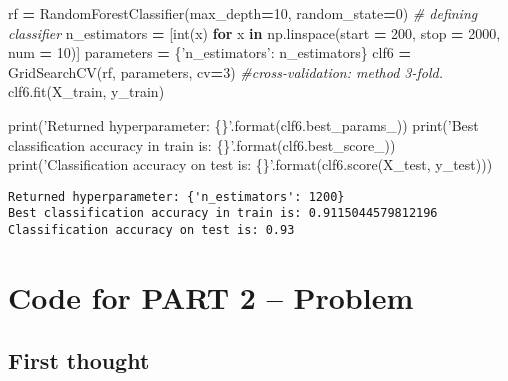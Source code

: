 \documentclass[10pt,a4paper]{article}
\newenvironment{Shaded}{\begin{snugshade}}{\end{snugshade}}
\newcommand{\BuiltInTok}[1]{#1}
\newcommand{\CommentTok}[1]{\textcolor[rgb]{0.56,0.35,0.01}{\textit{#1}}}
\newcommand{\ControlFlowTok}[1]{\textcolor[rgb]{0.13,0.29,0.53}{\textbf{#1}}}
\newcommand{\DecValTok}[1]{\textcolor[rgb]{0.00,0.00,0.81}{#1}}
\newcommand{\KeywordTok}[1]{\textcolor[rgb]{0.13,0.29,0.53}{\textbf{#1}}}
\newcommand{\NormalTok}[1]{#1}
\newcommand{\OperatorTok}[1]{\textcolor[rgb]{0.81,0.36,0.00}{\textbf{#1}}}
\newcommand{\SpecialCharTok}[1]{\textcolor[rgb]{0.00,0.00,0.00}{#1}}
\newcommand{\StringTok}[1]{\textcolor[rgb]{0.31,0.60,0.02}{#1}}
\theoremstyle{break}
\begin{document}
\begin{Shaded}
\begin{Highlighting}[]
\NormalTok{rf }\OperatorTok{=}\NormalTok{ RandomForestClassifier(max_depth}\OperatorTok{=}\DecValTok{10}\NormalTok{, random_state}\OperatorTok{=}\DecValTok{0}\NormalTok{) }\CommentTok{# defining classifier}
\NormalTok{n_estimators }\OperatorTok{=}\NormalTok{ [}\BuiltInTok{int}\NormalTok{(x) }\ControlFlowTok{for}\NormalTok{ x }\KeywordTok{in}\NormalTok{ np.linspace(start }\OperatorTok{=} \DecValTok{200}\NormalTok{, stop }\OperatorTok{=} \DecValTok{2000}\NormalTok{, num }\OperatorTok{=} \DecValTok{10}\NormalTok{)]}
\NormalTok{parameters }\OperatorTok{=}\NormalTok{ \{}\StringTok{'n_estimators'}\NormalTok{: n_estimators\}}
\NormalTok{clf6 }\OperatorTok{=}\NormalTok{ GridSearchCV(rf, parameters, cv}\OperatorTok{=}\DecValTok{3}\NormalTok{) }\CommentTok{#cross-validation: method 3-fold.}
\NormalTok{clf6.fit(X_train, y_train)}

\BuiltInTok{print}\NormalTok{(}\StringTok{'Returned hyperparameter: }\SpecialCharTok{\{\}}\StringTok{'}\NormalTok{.}\BuiltInTok{format}\NormalTok{(clf6.best_params_))}
\BuiltInTok{print}\NormalTok{(}\StringTok{'Best classification accuracy in train is: }\SpecialCharTok{\{\}}\StringTok{'}\NormalTok{.}\BuiltInTok{format}\NormalTok{(clf6.best_score_))}
\BuiltInTok{print}\NormalTok{(}\StringTok{'Classification accuracy on test is: }\SpecialCharTok{\{\}}\StringTok{'}\NormalTok{.}\BuiltInTok{format}\NormalTok{(clf6.score(X_test, y_test)))}
\end{Highlighting}
\end{Shaded}

\begin{verbatim}
Returned hyperparameter: {'n_estimators': 1200}
Best classification accuracy in train is: 0.9115044579812196
Classification accuracy on test is: 0.93
\end{verbatim}

\newpage

\hypertarget{annexe:annexe2}{%
\section{Code for PART 2 -- Problem}\label{annexe:annexe2}}

\hypertarget{first-thought-1}{%
\subsection{First thought}\label{first-thought-1}}
\end{document}
